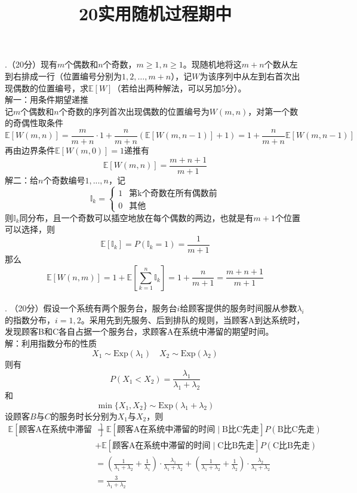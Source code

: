 \documentclass[UTF8]{ctexart}
\title{20实用随机过程期中}
\author{\calligra{NULIOUS}}
\date{}
\begin{document}
\maketitle
	
.（20分）现有$m$个偶数和$n$个奇数，$m \geq 1, n \geq 1$。现随机地将这$m+n$个数从左到右排成一行（位置编号分别为$1,2,\ldots,m+n$），记$W$为该序列中从左到右首次出现偶数的位置编号，求$\mathbb{E}[W]$（若给出两种解法，可以另加5分）。\\
解一：用条件期望递推\\
记$m$个偶数和$n$个奇数的序列首次出现偶数的位置编号为$W(m,n)$，对第一个数的奇偶性取条件
\[
\mathbb{E}[W(m,n)]= \frac{m}{m+n}\cdot 1+\frac{n}{m+n}\left(\mathbb{E}[W(m,n-1)]+1 \right)=1+\frac{n}{m+n}\mathbb{E}[W(m,n-1)] 
\]
再由边界条件$\mathbb{E}[W(m,0)]=1$递推有
\[
\mathbb{E}[W(m,n)]=\frac{m+n+1}{m+1}
\]
解二：给$n$个奇数编号$1,...,n$，记
\[
\mathbb{I}_k=
\begin{cases}
	1  &  \text{第k个奇数在所有偶数前} \\
	0  &  \text{其他}
\end{cases}
\]
则$\mathbb{I}_k$同分布，且一个奇数可以插空地放在每个偶数的两边，也就是有$m+1$个位置可以选择，则
\[
\mathbb{E}[\mathbb{I}_k]=P(\mathbb{I}_k=1)=\frac{1}{m+1}
\]
那么
\[
\mathbb{E}[W(n,m)]=1+\mathbb{E}\left[\sum_{k=1}^n  \mathbb{I}_k \right]=1+\frac{n}{m+1}=\frac{m+n+1}{m+1} 
\]\\

	
. （20分）假设一个系统有两个服务台，服务台$i$给顾客提供的服务时间服从参数$\lambda_i$的指数分布，$i=1,2$。采用先到先服务、后到排队的规则，当顾客A到达系统时，发现顾客B和C各自占据一个服务台，求顾客A在系统中滞留的期望时间。\\
解：利用指数分布的性质
\[
X_1\sim \mathrm{Exp}(\lambda_1) \quad X_2\sim \mathrm{Exp}(\lambda_2) 
\]
则有
\[
P(X_1<X_2)=\frac{\lambda_1}{\lambda_1+\lambda_2}
\]
和
\[
\min\{X_1,X_2\} \sim \mathrm{Exp}(\lambda_1+\lambda_2)
\]
设顾客$B$与$C$的服务时长分别为$X_1$与$X_2$，则
\begin{align*}
	\mathbb{E}\left[\text{顾客A在系统中滞留的时间} \right]  &= \mathbb{E}\left[\text{顾客A在系统中滞留的时间}\mid \text{B比C先走} \right]P(\text{B比C先走})\\
	&+\mathbb{E}\left[\text{顾客A在系统中滞留的时间}\mid \text{C比B先走} \right]P(\text{C比B先走}) \\
	& = \left(\frac{1}{\lambda_1+\lambda_2}+\frac{1}{\lambda_1} \right)\cdot \frac{\lambda_1}{\lambda_1+\lambda_2}+ \left(\frac{1}{\lambda_1+\lambda_2}+\frac{1}{\lambda_2} \right)\cdot \frac{\lambda_2}{\lambda_1+\lambda_2}\\
	&=\frac{3}{\lambda_1+\lambda_2}
\end{align*}\\
\end{document}
